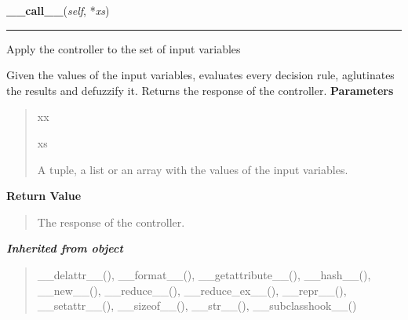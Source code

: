     \vspace{0.5ex}

\hspace{.8\funcindent}\begin{boxedminipage}{\funcwidth}

    \raggedright \textbf{\_\_call\_\_}(\textit{self}, *\textit{xs})

    \vspace{-1.5ex}

    \rule{\textwidth}{0.5\fboxrule}
\setlength{\parskip}{2ex}

Apply the controller to the set of input variables

Given the values of the input variables, evaluates every decision rule,
aglutinates the results and defuzzify it. Returns the response of the
controller.
\setlength{\parskip}{1ex}
      \textbf{Parameters}
      \vspace{-1ex}

      \begin{quote}
        \begin{Ventry}{xx}

          \item[xs]


A tuple, a list or an array with the values of the input variables.
        \end{Ventry}

      \end{quote}

      \textbf{Return Value}
    \vspace{-1ex}

      \begin{quote}

The response of the controller.
      \end{quote}

    \end{boxedminipage}


\large{\textbf{\textit{Inherited from object}}}

\begin{quote}
\_\_delattr\_\_(), \_\_format\_\_(), \_\_getattribute\_\_(), \_\_hash\_\_(), \_\_new\_\_(), \_\_reduce\_\_(), \_\_reduce\_ex\_\_(), \_\_repr\_\_(), \_\_setattr\_\_(), \_\_sizeof\_\_(), \_\_str\_\_(), \_\_subclasshook\_\_()
\end{quote}


